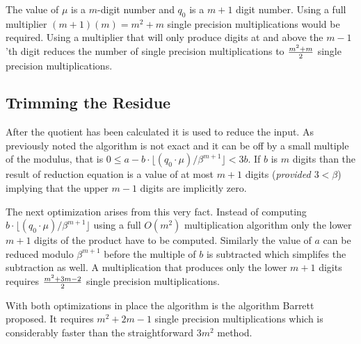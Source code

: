 \documentclass[b5paper]{book}
\begin{document}
The value of $\mu$ is a $m$-digit number and $q_0$ is a $m + 1$ digit number.  Using a full multiplier $(m + 1)(m) = m^2 + m$ single precision
multiplications would be required.  Using a multiplier that will only produce digits at and above the $m - 1$'th digit reduces the number
of single precision multiplications to ${m^2 + m} \over 2$ single precision multiplications.  

\subsection{Trimming the Residue}
After the quotient has been calculated it is used to reduce the input.  As previously noted the algorithm is not exact and it can be off by a small
multiple of the modulus, that is $0 \le a - b \cdot \lfloor (q_0 \cdot \mu) / \beta^{m+1} \rfloor < 3b$.  If $b$ is $m$ digits than the 
result of reduction equation is a value of at most $m + 1$ digits (\textit{provided $3 < \beta$}) implying that the upper $m - 1$ digits are
implicitly zero.  

The next optimization arises from this very fact.  Instead of computing $b \cdot \lfloor (q_0 \cdot \mu) / \beta^{m+1} \rfloor$ using a full
$O(m^2)$ multiplication algorithm only the lower $m+1$ digits of the product have to be computed.  Similarly the value of $a$ can
be reduced modulo $\beta^{m+1}$ before the multiple of $b$ is subtracted which simplifes the subtraction as well.  A multiplication that produces 
only the lower $m+1$ digits requires ${m^2 + 3m - 2} \over 2$ single precision multiplications.  

With both optimizations in place the algorithm is the algorithm Barrett proposed.  It requires $m^2 + 2m - 1$ single precision multiplications which
is considerably faster than the straightforward $3m^2$ method.  
\end{document}
